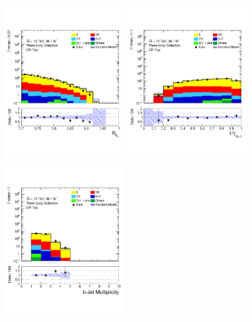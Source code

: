\begin{figure}[!htb]
    \begin{center}
        \includegraphics[width=0.48\textwidth]{figures/search_stop2l/bkg_est/crtop/crt_RPT}
        \includegraphics[width=0.48\textwidth]{figures/search_stop2l/bkg_est/crtop/crt_gamInvRp1}
        \includegraphics[width=0.48\textwidth]{figures/search_stop2l/bkg_est/crtop/crt_nBJets}

\end{center}
\end{figure}
